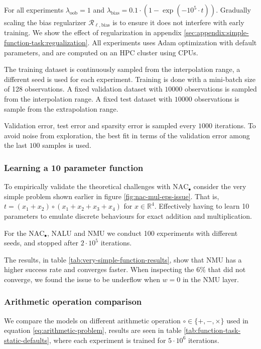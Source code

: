 For all experiments $\lambda_{\mathrm{oob}} = 1$ and $\lambda_{\mathrm{bias}} = 0.1 \cdot (1 - \exp(-10^5 \cdot t))$. Gradually scaling the bias regularizer $\mathcal{R}_{\ell,\mathrm{bias}}$ is to ensure it does not interfere with early training. We show the effect of regularization in appendix \ref{sec:appendix:simple-function-task:regualization}. All experiments uses Adam optimization \cite{adam-optimization} with default parameters, and are computed on an HPC cluster using  CPUs.

The training dataset is continuously sampled from the interpolation range, a different seed is used for each experiment. Training is done with a mini-batch size of 128 observations. A fixed validation dataset with $10000$ observations is sampled from the interpolation range. A fixed test dataset with $10000$ observations is sample from the extrapolation range.

Validation error, test error and sparsity error is sampled every $1000$ iterations. To avoid noise from exploration, the best fit in terms of the validation error among the last $100$ samples is used.

\subsubsection{Learning a 10 parameter function}

To empirically validate the theoretical challenges with $\mathrm{NAC}_{\bullet}$ consider the very simple problem shown earlier in figure \ref{fig:nac-mul-eps-issue}. That is, $t = (x_1 + x_2) \circ (x_1 + x_2 + x_3 + x_4)$ for $x \in \mathbb{R}^4$.
Effectively having to learn 10 parameters to emulate discrete behaviours for exact addition and multiplication.

For the $\mathrm{NAC}_{\bullet}$, NALU and NMU we conduct 100 experiments with different seeds, and stopped after $2 \cdot 10^5$ iterations.

The results, in table \ref{tab:very-simple-function-results}, show that NMU has a higher success rate and converges faster. When inspecting the $6\%$ that did not converge, we found the issue to be underflow when $w = 0$ in the NMU layer.


\subsubsection{Arithmetic operation comparison}
We compare the models on different arithmetic operation $\circ \in \{+, -, \times\}$ used in equation \ref{eq:arithmetic-problem}, results are seen in table \ref{tab:function-task-static-defaults}, where each experiment is trained for $5 \cdot 10^6$ iterations.

